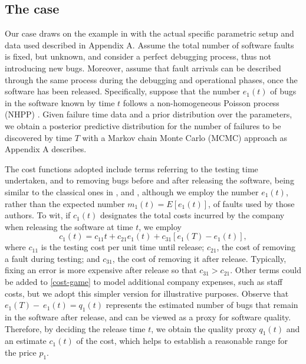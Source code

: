 \documentclass[a4paper,fleqn, 11pt]{cas-sc}
\begin{document}
\subsection{The case}\label{subsec:example}

 Our case draws on %
  the example in \cite{softearlier} with the actual specific parametric setup and data used described in Appendix A.
 Assume the total number of software faults is fixed, but unknown, and consider a perfect debugging process, thus not
  introducing new bugs. %
   Moreover, assume that fault arrivals can be described through the same process during the debugging and operational phases, once the software has been released.
 Specifically, suppose that the number $e_1(t)$
of bugs in the software known by time $t$ follows a non-homogeneous Poisson process (NHPP) %
  \cite{BASP}. %
   Given failure time data and a prior distribution over the parameters, we obtain a posterior predictive distribution 
  for the number
of failures to be discovered by time $T$ with a Markov chain 
Monte Carlo (MCMC) approach as Appendix A describes.

The cost functions adopted include terms referring to the
testing time undertaken, and to removing bugs
before and after releasing the software, being similar to the classical ones in \cite{Okumoto1979}, and \cite{Zeephongsekul1995},
 although we employ the number $e_1(t)$, rather than the expected number $m_1(t)= E[e_1(t)]$, of
 faults used by those authors. To wit, 
  if $c_1(t)$ designates the total costs incurred by the 
    company when releasing the software at time $t$, we employ  
\begin{equation}\label{cost-game}
c_1 (t) = c_{11} t + c_{21} e_1(t) + c_{31} \left[e_1(T)-e_1(t)\right], 
\end{equation} 
where $c_{11}$ is the testing cost  per unit time until release; $c_{21}$, the cost of removing a fault during testing;  and $c_{31}$, the cost of removing it after release. Typically, fixing an error is more expensive after release so
  that $c_{31} > c_{21}$. Other terms could be added to \eqref{cost-game} to model additional company expenses, such as staff costs, but we adopt this simpler version for illustrative purposes.  %
Observe that $ e_1(T)-~e_1 (t)= q_1 (t)$ represents the 
estimated number of bugs that remain in the software after release, and can be viewed as a proxy for software
  quality.
Therefore, by deciding the release time $t$, we obtain the quality proxy $q_1(t)$ and an estimate $c_1(t)$ of the cost, which helps 
 to establish a reasonable range for the price $p_1$. 
\end{document}
